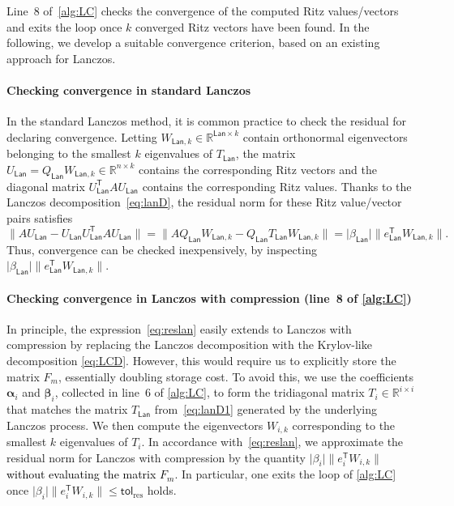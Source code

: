 \documentclass{siamart190516}
\newcommand{\Ttran}{\mathsf{T}}
\newcommand{\tol}{\mathsf{tol}}
\newcommand{\lan}{\mathsf{Lan}}
\newcommand{\R}{\mathbb{R}}
\providecommand{\abs}[1]{\lvert#1\rvert}
\providecommand{\norm}[1]{\lVert#1\rVert}
\providecommand{\edit}[1]{\textcolor{black}{#1}}
\begin{document}
Line~8 of~\cref{alg:LC} checks the convergence of the computed Ritz values/vectors and exits the loop once $k$ converged Ritz vectors have been found.
In the following, we develop a suitable convergence criterion, based on an existing approach for Lanczos.

\paragraph{Checking convergence in standard Lanczos}

In the standard Lanczos method, it is common practice to check the residual for declaring convergence. Letting $W_{\lan,k}\in\R^{\lan\times k}$ contain orthonormal eigenvectors belonging to the smallest $k$ eigenvalues of $T_{\lan}$, the matrix $U_{\lan}=Q_{\lan}W_{\lan,k}\in\R^{n\times k}$ contains the corresponding Ritz vectors and the diagonal matrix
$U_{\lan}^{\Ttran}AU_{\lan}$ contains the corresponding Ritz values.
Thanks to the Lanczos decomposition~\cref{eq:lanD}, the residual norm for these Ritz value/vector pairs satisfies
\begin{equation} \label{eq:reslan}
    \norm{AU_{\lan}-U_{\lan}U_{\lan}^{\Ttran}AU_{\lan}} = \norm{AQ_{\lan}W_{\lan,k}-Q_{\lan}T_{\lan}W_{\lan,k}} = \abs{\beta_{\lan}} \norm{e_{\lan}^{\Ttran}W_{\lan,k}}.
\end{equation} 
Thus, convergence can be checked inexpensively, by inspecting $\abs{\beta_{\lan}} \norm{e_{\lan}^{\Ttran}W_{\lan,k}}$.

\paragraph{Checking convergence in Lanczos with compression (line~8 of \cref{alg:LC})}

In principle, the expression~\cref{eq:reslan} easily extends 
to Lanczos with compression by replacing the Lanczos decomposition with the Krylov-like decomposition \cref{eq:LCD}. However, this would require us to explicitly store the matrix $F_{m}$, essentially doubling storage cost.
To avoid this, we use the coefficients $\boldsymbol\alpha_{i}$ and $\boldsymbol\beta_{i}$, collected in line~6 of \cref{alg:LC}, to form the tridiagonal matrix $T_{i}\in\R^{i\times i}$ that matches the matrix $T_{\lan}$ from~\cref{eq:lanD1} generated by the underlying Lanczos process. We then compute the eigenvectors $W_{i,k}$ corresponding to the smallest $k$ eigenvalues of $T_{i}$. In accordance with~\cref{eq:reslan}, we approximate the residual norm for Lanczos with compression by the quantity $\abs{\beta_{i}}\norm{e_{i}^{\Ttran}W_{i,k}}$ \edit{without evaluating the matrix $F_{m}$}. 
In particular, one exits the loop of \cref{alg:LC} once $\abs{\beta_{i}}\norm{e_{i}^{\Ttran}W_{i,k}}\leq \tol_{\mathrm{res}}$ holds.
\end{document}
